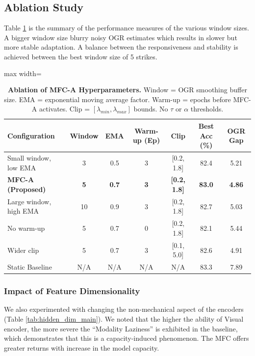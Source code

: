 \documentclass[preprint,a4paper, 10pt, 5p]{elsarticle}
\begin{document}
\subsection{Ablation Study}
Table \ref{tab:ablation} is the summary of the performance measures of the various window sizes. A bigger window size blurry noisy OGR estimates which results in slower but more stable adaptation. A balance between the responsiveness and stability is achieved between the best window size of 5 strikes.

\begin{table}[t]
\caption{\textbf{Ablation of MFC-A Hyperparameters.} Window = OGR smoothing buffer size. EMA = exponential moving average factor. Warm-up = epochs before MFC-A activates. Clip = $[\lambda_{min}, \lambda_{max}]$ bounds. No $\tau$ or $\alpha$ thresholds.}
\label{tab:ablation}
\centering
\begin{adjustbox}{max width=\linewidth}\begin{tabular}{@{}lcccccc@{}}
\toprule
\textbf{Configuration} & \textbf{Window} & \textbf{EMA} & \textbf{Warm-up (Ep)} & \textbf{Clip} & \textbf{Best Acc (\%)} & \textbf{OGR Gap} \\ \midrule
Small window, low EMA  & 3  & 0.5 & 3 & [0.2, 1.8] & 82.4 & 5.21 \\
\textbf{MFC-A (Proposed)} & \textbf{5} & \textbf{0.7} & \textbf{3} & \textbf{[0.2, 1.8]} & \textbf{83.0} & \textbf{4.86} \\
Large window, high EMA & 10 & 0.9 & 3 & [0.2, 1.8] & 82.7 & 5.03 \\
No warm-up             & 5  & 0.7 & 0 & [0.2, 1.8] & 82.1 & 5.44 \\
Wider clip             & 5  & 0.7 & 3 & [0.1, 5.0] & 82.6 & 4.91 \\
Static Baseline        & N/A & N/A & N/A & N/A       & 83.3 & 7.89 \\
\bottomrule
\end{tabular}\end{adjustbox}
\end{table}

\subsubsection*{Impact of Feature Dimensionality}
We also experimented with changing the non-me\-chan\-i\-cal aspect of the encoders (Table \ref{tab:hidden_dim_main}). We noted that the higher the ability of Visual encoder, the more severe the ``Modality Laziness'' is exhibited in the baseline, which demonstrates that this is a capacity-induced phenomenon. The MFC offers greater returns with increase in the model capacity.
\end{document}
